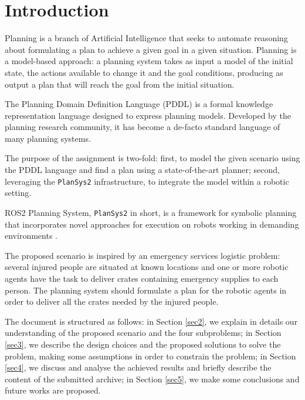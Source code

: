 \section{Introduction}
Planning is a branch of Artificial Intelligence that seeks to automate reasoning about
formulating a plan to achieve a given goal in a given situation. 
Planning is a model-based approach: a planning system takes as input a model of the initial state, 
the actions available to change it and the goal conditions, producing as output a plan 
that will reach the goal from the initial situation.

The Planning Domain Definition Language (PDDL) is a formal knowledge representation language 
designed to express planning models. Developed by the planning research community, 
it has become a de-facto standard language of many planning systems.

The purpose of the assignment is two-fold: first, to model the given scenario using the PDDL language 
and find a plan using a state-of-the-art planner; second, leveraging the \texttt{PlanSys2} \cite{PlanSys2} 
infrastructure, to integrate the model within a robotic setting.

ROS2 Planning System, \texttt{PlanSys2} in short, is a framework for symbolic planning that incorporates 
novel approaches for execution on robots working in demanding environments \cite{PlanSys2}.

The proposed scenario is inspired by an emergency services logistic problem:
several injured people are situated at known locations and one or more robotic agents
have the task to deliver crates containing emergency supplies to each person. 
The planning system should formulate a plan for the robotic agents in order to deliver all
the crates needed by the injured people.

The document is structured as follows: in Section \ref{sec2},
we explain in details our understanding of the proposed scenario and the four subproblems; 
in Section \ref{sec3}, we describe the design choices and the proposed solutions to solve the problem,
making some assumptions in order to constrain the problem; %
in Section \ref{sec4}, we discuss and analyse the achieved results and briefly describe the
content of the submitted archive; in Section \ref{sec5}, we make some conclusions and future 
works are proposed.


